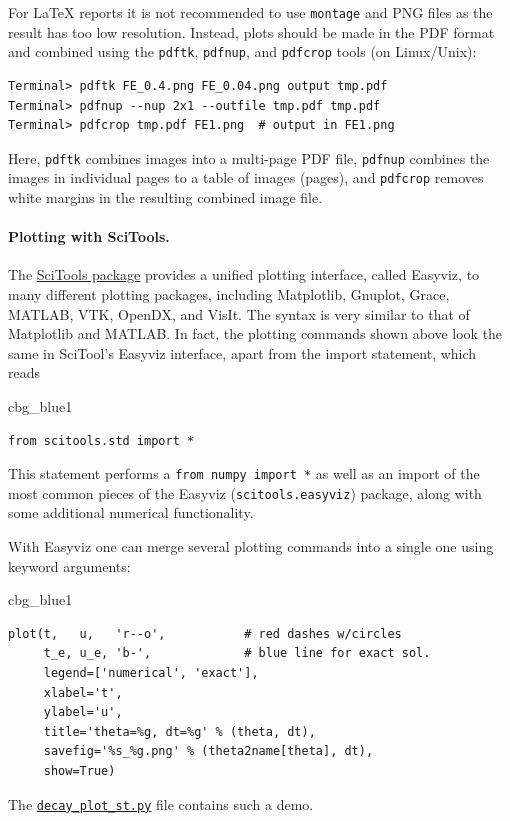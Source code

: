 \documentclass[%
oneside,                 %
final,                   %
10pt]{article}
\newenvironment{_cod_tight}[1]{
   \def\FrameCommand{\colorbox{#1}}
   \FrameRule0.6pt\MakeFramed {\FrameRestore}\vskip3mm}
   {\vskip0mm\endMakeFramed}
\newenvironment{cod}[1]{
\bgroup\rmfamily
\fboxsep=0mm\relax
\begin{_cod_tight}{#1}
\list{}{\parsep=-2mm\parskip=0mm\topsep=0pt\leftmargin=2mm
\rightmargin=2\leftmargin\leftmargin=4pt\relax}
\item\relax}
{\endlist\end{_cod_tight}\egroup}
\begin{document}
For {\LaTeX} reports it is not recommended to use \texttt{montage} and PNG files
as the result has too low resolution. Instead, plots should be made
in the PDF format and combined using the \texttt{pdftk}, \texttt{pdfnup}, and \texttt{pdfcrop} tools
(on Linux/Unix):

\begin{Verbatim}[frame=lines,label=\fbox{{\tiny Terminal}},framesep=2.5mm,framerule=0.7pt,fontsize=\fontsize{9pt}{9pt}]
Terminal> pdftk FE_0.4.png FE_0.04.png output tmp.pdf
Terminal> pdfnup --nup 2x1 --outfile tmp.pdf tmp.pdf
Terminal> pdfcrop tmp.pdf FE1.png  # output in FE1.png
\end{Verbatim}
Here, \texttt{pdftk} combines images into a multi-page PDF file, \texttt{pdfnup}
combines the images in individual pages to a table of images (pages),
and \texttt{pdfcrop} removes white margins in the resulting combined image file.


\paragraph{Plotting with SciTools.}
The \href{{https://github.com/hplgit/scitools}}{SciTools package} provides a
unified plotting interface, called Easyviz, to many different plotting
packages, including Matplotlib, Gnuplot, Grace, MATLAB,
VTK, OpenDX, and VisIt. The syntax is very similar to that of
Matplotlib and MATLAB. In fact, the plotting commands shown above look
the same in SciTool's Easyviz interface, apart from the import
statement, which reads

\begin{cod}{cbg_blue1}\begin{Verbatim}[numbers=none,fontsize=\fontsize{9pt}{9pt},baselinestretch=0.95,xleftmargin=2mm]
from scitools.std import *
\end{Verbatim}
\end{cod}
\noindent
This statement performs a \texttt{from numpy import *} as well as an import
of the most common pieces of the Easyviz (\texttt{scitools.easyviz}) package,
along with some additional numerical functionality.

With Easyviz one can
merge several plotting commands into a single one
using keyword arguments:

\begin{cod}{cbg_blue1}\begin{Verbatim}[numbers=none,fontsize=\fontsize{9pt}{9pt},baselinestretch=0.95,xleftmargin=2mm]
plot(t,   u,   'r--o',           # red dashes w/circles
     t_e, u_e, 'b-',             # blue line for exact sol.
     legend=['numerical', 'exact'],
     xlabel='t',
     ylabel='u',
     title='theta=%g, dt=%g' % (theta, dt),
     savefig='%s_%g.png' % (theta2name[theta], dt),
     show=True)
\end{Verbatim}
\end{cod}
\noindent
The \href{{http://tinyurl.com/ofkw6kc/alg/decay_plot_st.py}}{\nolinkurl{decay_plot_st.py}} file
contains such a demo.
\end{document}
